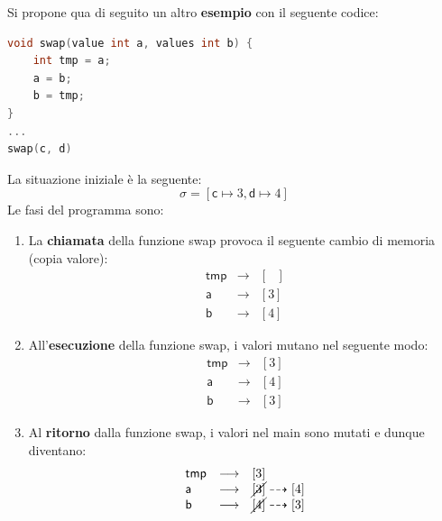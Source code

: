 \documentclass[a4paper]{article}
\begin{document}
	\noindent
	Si propone qua di seguito un altro \textcolor{Green4}{\textbf{esempio}} con il seguente codice:
	\begin{lstlisting}[language=C]
void swap(value int a, values int b) {
	int tmp = a;
	a = b;
	b = tmp;
}
...
swap(c, d)\end{lstlisting}
	La situazione iniziale è la seguente:
	\begin{equation*}
		\sigma = \left[\textsf{c} \mapsto 3, \textsf{d} \mapsto 4\right]
	\end{equation*}
	Le fasi del programma sono:
	\begin{enumerate}
		\item La \textbf{chiamata} della funzione \textsf{swap} provoca il seguente cambio di memoria (copia valore):
		\begin{equation*}
			\begin{array}{lll}
				\textsf{tmp} &\longrightarrow& \left[ \:\:\: \right] \\
				\textsf{a} 	 &\longrightarrow& \left[ 3 \right] \\
				\textsf{b} 	 &\longrightarrow& \left[ 4 \right]
			\end{array}
		\end{equation*}

		\item All'\textbf{esecuzione} della funzione \textsf{swap}, i valori mutano nel seguente modo:
		\begin{equation*}
			\begin{array}{lll}
				\textsf{tmp} &\longrightarrow& \left[ 3 \right] \\
				\textsf{a} 	 &\longrightarrow& \left[ 4 \right] \\
				\textsf{b} 	 &\longrightarrow& \left[ 3 \right]
			\end{array}
		\end{equation*}

		\item Al \textbf{ritorno} dalla funzione \textsf{swap}, i valori nel \textsf{main} sono mutati e dunque diventano:
		\begin{equation*}
			\begin{array}{lll}
				\textsf{tmp} &\longrightarrow& \left[ 3 \right] \\
				\textsf{a} 	 &\longrightarrow& \cancel{\left[ 3 \right]} \dashrightarrow \left[4\right] \\
				\textsf{b} 	 &\longrightarrow& \cancel{\left[ 4 \right]} \dashrightarrow \left[3\right]
			\end{array}
		\end{equation*}
	\end{enumerate}
\end{document}
